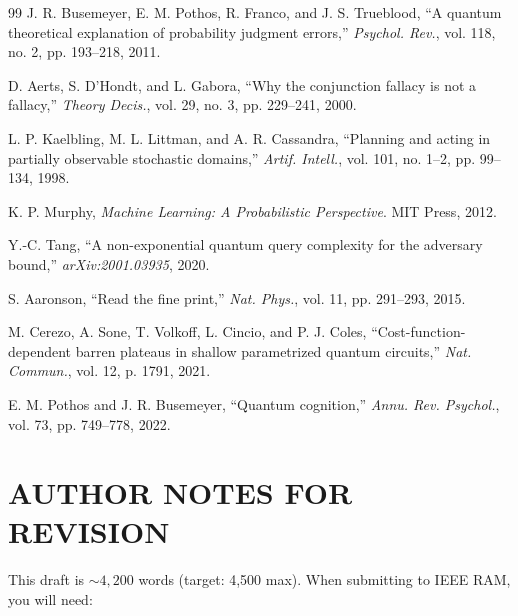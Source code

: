 \documentclass[journal]{IEEEtran}
\begin{document}
\begin{thebibliography}{99}
 J. R. Busemeyer, E. M. Pothos, R. Franco, and J. S. Trueblood, ``A quantum theoretical explanation of probability judgment errors,'' \textit{Psychol. Rev.}, vol. 118, no. 2, pp. 193--218, 2011.

 D. Aerts, S. D'Hondt, and L. Gabora, ``Why the conjunction fallacy is not a fallacy,'' \textit{Theory Decis.}, vol. 29, no. 3, pp. 229--241, 2000.

 L. P. Kaelbling, M. L. Littman, and A. R. Cassandra, ``Planning and acting in partially observable stochastic domains,'' \textit{Artif. Intell.}, vol. 101, no. 1--2, pp. 99--134, 1998.

 K. P. Murphy, \textit{Machine Learning: A Probabilistic Perspective}. MIT Press, 2012.

 Y.-C. Tang, ``A non-exponential quantum query complexity for the adversary bound,'' \textit{arXiv:2001.03935}, 2020.

 S. Aaronson, ``Read the fine print,'' \textit{Nat. Phys.}, vol. 11, pp. 291--293, 2015.

 M. Cerezo, A. Sone, T. Volkoff, L. Cincio, and P. J. Coles, ``Cost-function-dependent barren plateaus in shallow parametrized quantum circuits,'' \textit{Nat. Commun.}, vol. 12, p. 1791, 2021.

 E. M. Pothos and J. R. Busemeyer, ``Quantum cognition,'' \textit{Annu. Rev. Psychol.}, vol. 73, pp. 749--778, 2022.

\end{thebibliography}

\section*{AUTHOR NOTES FOR REVISION}

This draft is $\sim4,200$ words (target: 4,500 max). When submitting to IEEE RAM, you will need:
\end{document}
